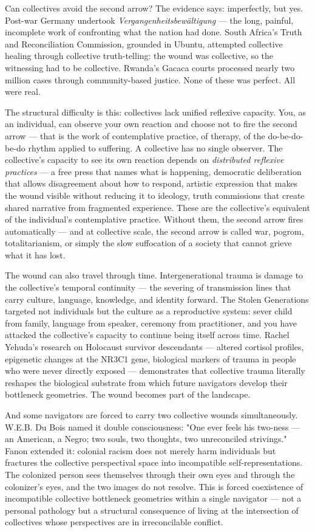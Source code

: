 Can collectives avoid the second arrow? The evidence says: imperfectly, but yes. Post-war Germany undertook \textit{Vergangenheitsbewältigung} — the long, painful, incomplete work of confronting what the nation had done. South Africa's Truth and Reconciliation Commission, grounded in Ubuntu, attempted collective healing through collective truth-telling: the wound was collective, so the witnessing had to be collective. Rwanda's Gacaca courts processed nearly two million cases through community-based justice. None of these was perfect. All were real.


The structural difficulty is this: collectives lack unified reflexive capacity. You, as an individual, can observe your own reaction and choose not to fire the second arrow — that is the work of contemplative practice, of therapy, of the do-be-do-be-do rhythm applied to suffering. A collective has no single observer. The collective's capacity to see its own reaction depends on \textit{distributed reflexive practices} — a free press that names what is happening, democratic deliberation that allows disagreement about how to respond, artistic expression that makes the wound visible without reducing it to ideology, truth commissions that create shared narrative from fragmented experience. These are the collective's equivalent of the individual's contemplative practice. Without them, the second arrow fires automatically — and at collective scale, the second arrow is called war, pogrom, totalitarianism, or simply the slow suffocation of a society that cannot grieve what it has lost.


The wound can also travel through time. Intergenerational trauma is damage to the collective's temporal continuity — the severing of transmission lines that carry culture, language, knowledge, and identity forward. The Stolen Generations targeted not individuals but the culture as a reproductive system: sever child from family, language from speaker, ceremony from practitioner, and you have attacked the collective's capacity to continue being itself across time. Rachel Yehuda's research on Holocaust survivor descendants — altered cortisol profiles, epigenetic changes at the NR3C1 gene, biological markers of trauma in people who were never directly exposed — demonstrates that collective trauma literally reshapes the biological substrate from which future navigators develop their bottleneck geometries. The wound becomes part of the landscape.


And some navigators are forced to carry two collective wounds simultaneously. W.E.B. Du Bois named it double consciousness: "One ever feels his two-ness — an American, a Negro; two souls, two thoughts, two unreconciled strivings." Fanon extended it: colonial racism does not merely harm individuals but fractures the collective perspectival space into incompatible self-representations. The colonized person sees themselves through their own eyes and through the colonizer's eyes, and the two images do not resolve. This is forced coexistence of incompatible collective bottleneck geometries within a single navigator — not a personal pathology but a structural consequence of living at the intersection of collectives whose perspectives are in irreconcilable conflict.


